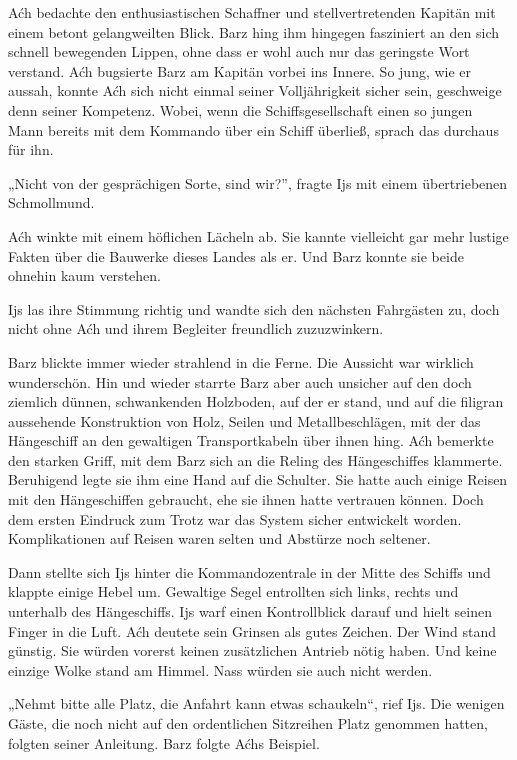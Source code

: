 Aćh bedachte den enthusiastischen Schaffner und stellvertretenden Kapitän mit einem betont gelangweilten Blick. Barz hing ihm hingegen fasziniert an den sich schnell bewegenden Lippen, ohne dass er wohl auch nur das geringste Wort verstand. Aćh bugsierte Barz am Kapitän vorbei ins Innere. So jung, wie er aussah, konnte Aćh sich nicht einmal seiner Volljährigkeit sicher sein, geschweige denn seiner Kompetenz. Wobei, wenn die Schiffsgesellschaft einen so jungen Mann bereits mit dem Kommando über ein Schiff überließ, sprach das durchaus für ihn.

„Nicht von der gesprächigen Sorte, sind wir?”, fragte Ijs mit einem übertriebenen Schmollmund.

Aćh winkte mit einem höflichen Lächeln ab. Sie kannte vielleicht gar mehr lustige Fakten über die Bauwerke dieses Landes als er. Und Barz konnte sie beide ohnehin kaum verstehen.

Ijs las ihre Stimmung richtig und wandte sich den nächsten Fahrgästen zu, doch nicht ohne Aćh und ihrem Begleiter freundlich zuzuzwinkern.

Barz blickte immer wieder strahlend in die Ferne. Die Aussicht war wirklich wunderschön. Hin und wieder starrte Barz aber auch unsicher auf den doch ziemlich dünnen, schwankenden Holzboden, auf der er stand, und auf die filigran aussehende Konstruktion von Holz, Seilen und Metallbeschlägen, mit der das Hängeschiff an den gewaltigen Transportkabeln über ihnen hing. Aćh bemerkte den starken Griff, mit dem Barz sich an die Reling des Hängeschiffes klammerte. Beruhigend legte sie ihm eine Hand auf die Schulter. Sie hatte auch einige Reisen mit den Hängeschiffen gebraucht, ehe sie ihnen hatte vertrauen können. Doch dem ersten Eindruck zum Trotz war das System sicher entwickelt worden. Komplikationen auf Reisen waren selten und Abstürze noch seltener.

Dann stellte sich Ijs hinter die Kommandozentrale in der Mitte des Schiffs und klappte einige Hebel um. Gewaltige Segel entrollten sich links, rechts und unterhalb des Hängeschiffs. Ijs warf einen Kontrollblick darauf und hielt seinen Finger in die Luft. Aćh deutete sein Grinsen als gutes Zeichen. Der Wind stand günstig. Sie würden vorerst keinen zusätzlichen Antrieb nötig haben. Und keine einzige Wolke stand am Himmel. Nass würden sie auch nicht werden.

„Nehmt bitte alle Platz, die Anfahrt kann etwas schaukeln“, rief Ijs. Die wenigen Gäste, die noch nicht auf den ordentlichen Sitzreihen Platz genommen hatten, folgten seiner Anleitung. Barz folgte Aćhs Beispiel.

